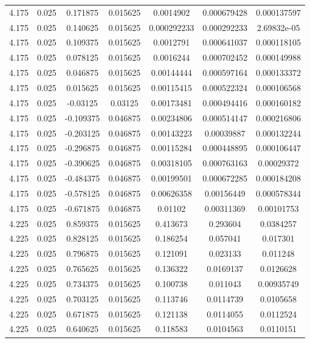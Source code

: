 \begin{flushleft}
\begin{longtable}{ccccccc}
4.175 & 0.025 & 0.171875 & 0.015625 & 0.0014902 & 0.000679428 & 0.000137597  \\ 
4.175 & 0.025 & 0.140625 & 0.015625 & 0.000292233 & 0.000292233 & 2.69832e-05  \\ 
4.175 & 0.025 & 0.109375 & 0.015625 & 0.0012791 & 0.000641037 & 0.000118105  \\ 
4.175 & 0.025 & 0.078125 & 0.015625 & 0.0016244 & 0.000702452 & 0.000149988  \\ 
4.175 & 0.025 & 0.046875 & 0.015625 & 0.00144444 & 0.000597164 & 0.000133372  \\ 
4.175 & 0.025 & 0.015625 & 0.015625 & 0.00115415 & 0.000522324 & 0.000106568  \\ 
4.175 & 0.025 & -0.03125 & 0.03125 & 0.00173481 & 0.000494416 & 0.000160182  \\ 
4.175 & 0.025 & -0.109375 & 0.046875 & 0.00234806 & 0.000514147 & 0.000216806  \\ 
4.175 & 0.025 & -0.203125 & 0.046875 & 0.00143223 & 0.00039887 & 0.000132244  \\ 
4.175 & 0.025 & -0.296875 & 0.046875 & 0.00115284 & 0.000448895 & 0.000106447  \\ 
4.175 & 0.025 & -0.390625 & 0.046875 & 0.00318105 & 0.000763163 & 0.00029372  \\ 
4.175 & 0.025 & -0.484375 & 0.046875 & 0.00199501 & 0.000672285 & 0.000184208  \\ 
4.175 & 0.025 & -0.578125 & 0.046875 & 0.00626358 & 0.00156449 & 0.000578344  \\ 
4.175 & 0.025 & -0.671875 & 0.046875 & 0.01102 & 0.00311369 & 0.00101753  \\ 
4.225 & 0.025 & 0.859375 & 0.015625 & 0.413673 & 0.293604 & 0.0384257  \\ 
4.225 & 0.025 & 0.828125 & 0.015625 & 0.186254 & 0.057041 & 0.017301  \\ 
4.225 & 0.025 & 0.796875 & 0.015625 & 0.121091 & 0.023133 & 0.011248  \\ 
4.225 & 0.025 & 0.765625 & 0.015625 & 0.136322 & 0.0169137 & 0.0126628  \\ 
4.225 & 0.025 & 0.734375 & 0.015625 & 0.100738 & 0.011043 & 0.00935749  \\ 
4.225 & 0.025 & 0.703125 & 0.015625 & 0.113746 & 0.0114739 & 0.0105658  \\ 
4.225 & 0.025 & 0.671875 & 0.015625 & 0.121138 & 0.0114055 & 0.0112524  \\ 
4.225 & 0.025 & 0.640625 & 0.015625 & 0.118583 & 0.0104563 & 0.0110151  \\ 

\end{longtable}
\end{flushleft}
